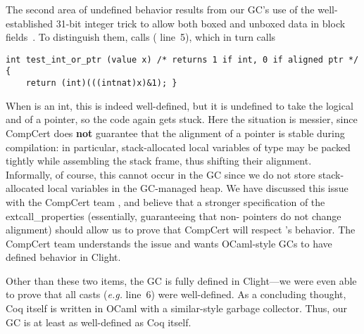 The second area of undefined behavior results from our GC's use of the well-established
31-bit integer trick to allow both boxed and unboxed data in block fields~\cite{realworldocaml}.
To distinguish them,  calls  ({\color{black} line~5}), which
in turn calls
\begin{lstlisting}[numbers=none]
int test_int_or_ptr (value x) /* returns 1 if int, 0 if aligned ptr */ {
    return (int)(((intnat)x)&1); }
\end{lstlisting}
When  is an int, this is indeed well-defined, but it is undefined to take the
logical and of a pointer, so the code again gets stuck.  Here the situation is messier,
since CompCert does \textbf{not} guarantee that the alignment of a pointer is stable during
compilation: in particular, stack-allocated local variables of type  may be packed
tightly while assembling the stack frame, thus shifting their alignment.  Informally, of course,
this cannot occur in the GC since we do not store stack-allocated local variables in the GC-managed
heap.  We have discussed this issue with the CompCert team \cite{leroy_email}, and believe that
a stronger specification of the extcall{\_}properties (essentially, guaranteeing that non- pointers do not change alignment) should allow us to prove that CompCert
will respect 's behavior.  The CompCert team understands the
issue and wants OCaml-style GCs to have defined behavior in Clight.

Other than these two items, the GC is fully defined in Clight---we were even able to
prove that all casts (\emph{e.g.} {\color{black} line~6}) were well-defined.
As a concluding thought, Coq itself is written in OCaml with a similar-style garbage collector.
Thus, our GC is at least as well-defined as Coq itself.
